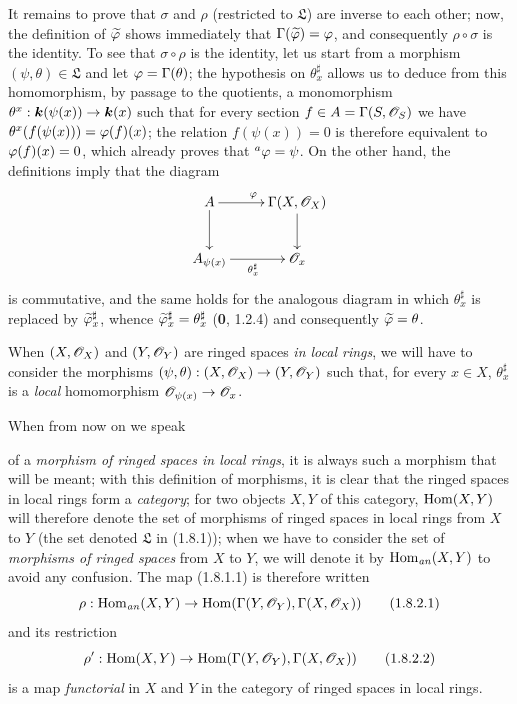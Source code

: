 It remains to prove that $\sigma$ and $\rho$ (restricted to $\mathfrak L$)
are inverse to each other; now, the definition of
$\widetilde{\varphi}$ shows immediately that
$\Gamma(\widetilde{\varphi})=\varphi$, and consequently $\rho\circ\sigma$ is
the identity. To see that $\sigma\circ\rho$ is the identity, let us start
from a morphism $(\psi,\theta)\in\mathfrak L$ and let
$\varphi=\Gamma(\theta)$; the hypothesis on $\theta_x^\sharp$ allows us to
deduce from this homomorphism, by passage to the quotients, a
monomorphism $\theta^x:\boldsymbol{k}(\psi(x))\to\boldsymbol{k}(x)$
such that for every section $f\in A=\Gamma(S,\mathscr{O}_S)$ we have
$\theta^x(f(\psi(x)))=\varphi(f)(x)$; the relation $f(\psi(x))=0$ is therefore
equivalent to $\varphi(f)(x)=0$, which already proves that
${}^a\varphi=\psi$. On the other hand, the definitions imply that the
diagram
\[
  \xymatrix{
    A\ar[r]^\vphi\ar[d] &
    \Gamma(X,\sh{O}_X)\ar[d]\\
    A_{\psi(x)}\ar[r]_{\theta_x^\sharp} &
    \sh{O}_x
  }
\]
is commutative, and the same holds for the analogous diagram in which
$\theta_x^\sharp$ is replaced by
$\widetilde{\varphi}_x^\sharp$, whence
$\widetilde{\varphi}_x^\sharp=\theta_x^\sharp$ (\textbf{0}, 1.2.4) and consequently
$\widetilde{\varphi}=\theta$.

\begin{env}[1.8.2]
\label{ega2:addendum:I.1.8.2}
When $(X,\mathscr{O}_X)$ and $(Y,\mathscr{O}_Y)$ are ringed spaces \emph{in
local rings}, we will have to consider the morphisms
$(\psi,\theta):(X,\mathscr{O}_X)\to(Y,\mathscr{O}_Y)$ such that, for every
$x\in X$, $\theta_x^\sharp$ is a \emph{local} homomorphism
$\mathscr{O}_{\psi(x)}\to\mathscr{O}_x$.

When from now on we speak
of a \emph{morphism of ringed spaces
in local rings}, it is always such a morphism that will be meant;
with this definition of morphisms, it is clear that the ringed spaces
in local rings form a \emph{category}; for two objects
$X,Y$ of this category, $\operatorname{Hom}(X,Y)$ will therefore denote the set of
morphisms of ringed spaces in local rings from $X$ to $Y$
(the set denoted $\mathfrak L$ in (1.8.1)); when we have to
consider the set of \emph{morphisms of ringed spaces} from $X$ to
$Y$, we will denote it by $\operatorname{Hom}_{\mathit{an}}(X,Y)$ to avoid any
confusion. The map (1.8.1.1) is therefore written
\begin{equation}
\label{ega2:addendum:I.1.8.2.1}
  \rho:\operatorname{Hom}_{\mathit{an}}(X,Y)
  \to\operatorname{Hom}(\Gamma(Y,\mathscr{O}_Y),\Gamma(X,\mathscr{O}_X))
\tag{1.8.2.1}
\end{equation}
and its restriction
\begin{equation}
\label{ega2:addendum:I.1.8.2.2}
  \rho':\operatorname{Hom}(X,Y)
  \to\operatorname{Hom}(\Gamma(Y,\mathscr{O}_Y),\Gamma(X,\mathscr{O}_X))
\tag{1.8.2.2}
\end{equation}
is a map \emph{functorial} in $X$ and $Y$ in the category of ringed
spaces in local rings.
\end{env}

